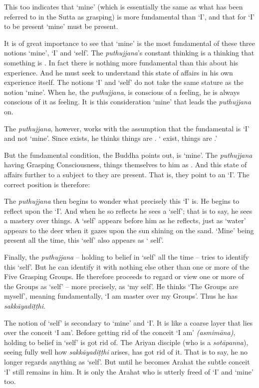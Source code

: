 This too indicates that `mine' (which is essentially the same as what has been referred to in the Sutta as grasping) is more fundamental than `I', and that for `I' to be present `mine' must be present.

It is of great  importance to see that `mine' is the most fundamental of these three notions `mine', `I' and `self'. The \emph{puthujjana}'s constant thinking is a thinking that something is . In fact there is nothing more fundamental than this about his experience. And he must seek to understand this state of affairs in his own experience itself. The notions `I' and `self' do not take the same stature as the notion `mine'. When he, the \emph{puthujjana}, is conscious of a feeling, he is always conscious of it as  feeling. It is this consideration `mine' that leads the \emph{puthujjana} on.

\enlargethispage{\baselineskip}

The \emph{puthujjana}, however, works with the assumption that the fundamental is `I' and not `mine'. Since  exists, he thinks things are . ` exist, things are .'

But the fundamental condition, the Buddha points out, is `mine'. The \emph{puthujjana} having Grasping Consciousness, things  themselves to him as . And this state of affairs further  to a subject to  they are present. That is, they point to an `I'. The correct position is therefore: 

The \emph{puthujjana} then begins to wonder what precisely this `I' is. He begins to reflect upon the `I'. And when he so reflects he sees a `self'; that is to say, he sees a mastery over things. A `self' appears before him as he reflects, just as `water' appears to the deer when it gazes upon the sun shining on the sand. `Mine' being present all the time, this `self' also appears as ` self'.

Finally, the \emph{puthujjana} -- holding to belief in `self' all the time -- tries to identify this `self'. But he can identify it with nothing else other than one or more of the Five Grasping Groups. He therefore proceeds to regard or view one or more of the Groups as `self' -- more precisely, as `my self'. He thinks `The Groups are myself', meaning fundamentally, `I am master over my Groups'. Thus he has \emph{sakkāyadiṭṭhi}.

The notion of `self' is secondary to `mine' and `I'. It is like a coarse layer that lies over the conceit `I am'. Before getting rid of the conceit `I am' \emph{(asmimāna)}, holding to belief in `self' is got rid of. The Ariyan disciple (who is a \emph{sotāpanna}), seeing fully well how \emph{sakkāyadiṭṭhi} arises, has got rid of it. That is to say, he no longer regards anything as `self'. But until he becomes Arahat the subtle conceit `I' still remains in him. It is only the Arahat who is utterly freed of `I' and `mine' too.
